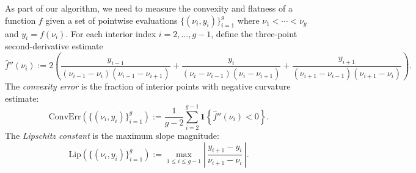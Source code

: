 \documentclass{article} %
\newcommand{\hp}{\nu}                             %
\newcommand{\gridsize}{g}
\newcommand{\Lip}{\mathrm{Lip}}
\newcommand{\ConvErr}{\mathrm{ConvErr}}
\begin{document}
As part of our algorithm, we need to measure the convexity and flatness of a function $f$ given a set of pointwise evaluations $\{(\hp_i, y_i)\}_{i=1}^{\gridsize}$ where $\hp_1 < \cdots < \hp_\gridsize$ and $y_i = f(\hp_i)$. For each interior index $i = 2, \ldots, \gridsize - 1$, define the three-point second-derivative estimate
\[
\hat{f}''(\hp_i)
:= 2\!\left(
\frac{y_{i-1}}{(\hp_{i-1}-\hp_i)(\hp_{i-1}-\hp_{i+1})}
+ \frac{y_i}{(\hp_i-\hp_{i-1})(\hp_i-\hp_{i+1})}
+ \frac{y_{i+1}}{(\hp_{i+1}-\hp_{i-1})(\hp_{i+1}-\hp_i)}
\right).
\]
The \emph{convexity error} is the fraction of interior points with
negative curvature estimate:
\begin{equation}\label{eq:conv_error}
\ConvErr(\{(\hp_i, y_i)\}_{i=1}^{\gridsize})
:= \frac{1}{\gridsize-2} \sum_{i=2}^{\gridsize-1}
   \mathbf{1}\!\left\{ \hat{f}''(\hp_i) < 0 \right\}.
\end{equation}
The \emph{Lipschitz constant} is the maximum slope magnitude:
\begin{equation}\label{eq:dlip}
\Lip(\{(\hp_i, y_i)\}_{i=1}^{\gridsize})
:= \max_{1 \le i \le \gridsize-1}
   \left|\,\frac{y_{i+1}-y_i}{\hp_{i+1}-\hp_i}\,\right|.
\end{equation}
\end{document}
